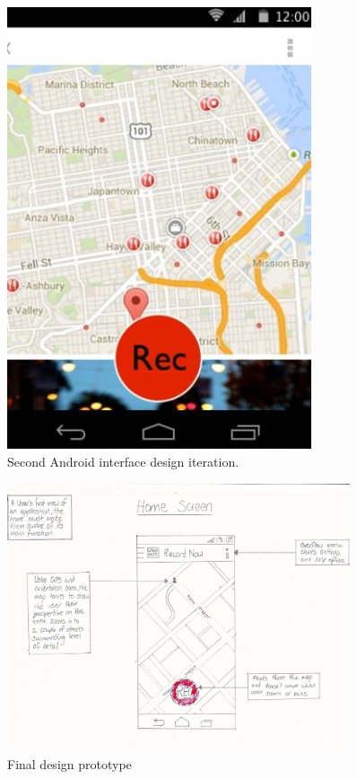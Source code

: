 \documentclass{l3proj}
\begin{document}
\newpage
\begin{figure}[ht!]
\centering
\includegraphics[width=0.8\textwidth]{images/android-digital-prototype-2.jpg}
\caption{Second Android interface design iteration.}
\end{figure}

\newpage
\begin{figure}[ht!]
\centering
\includegraphics[angle=270, width=0.9\textwidth]{images/android-home-view.jpg}
\caption{Final design prototype}
\end{figure}
\end{document}
